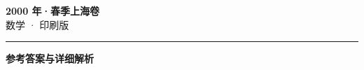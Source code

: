 \documentclass[zihao=5, a4paper]{ctexart}
\begin{document}
\begin{center}
  {\Large\bfseries 2000 年·春季上海卷}\\[4pt]
  {\large 数学 · 印刷版}
\end{center}
\medskip
{}

\par\bigskip\hrule\bigskip
{}
\begin{center}{\large\bfseries 参考答案与详细解析}\end{center}
\smallskip

\end{document}

